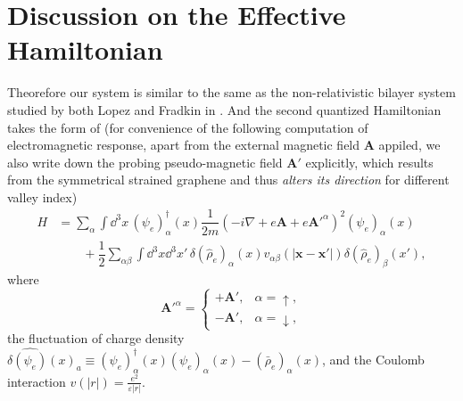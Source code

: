 \documentclass[bachelor,english,numbers]{ustcthesis}
\begin{document}
	\section{Discussion on the Effective Hamiltonian}
		\indent\par 
		\iffalse
			To sum up, in our case the free part of the massless Dirac fermion in graphene is now dominated by the second quantized Hamiltonian
			\begin{equation}\label{1.1.2}
				H_0=\sum_{\alpha}\sum_{\bm{p}}(\psi_e)_\alpha^\dagger (-1)^\alpha v_F\bm{\sigma}\cdot(\bm{p}+(-1)^\alpha e\bm{A})(\psi_e)_\alpha,
			\end{equation}
			where $a=1,2,3,4$ represent the sublattice and valley degenerancy such that the eigenstate is chosen in the order $(\psi_e)_\alpha\equiv\left((\psi_e)_{K\uparrow}, (\psi_e)_{K'\uparrow}, (\psi_e)_{K\downarrow}, (\psi_e)_{K'\downarrow}\right)$. The subscripts $e$ is still introduced to distinguish the field operators of massless Dirac fermions with those of composite Dirac fermions. But the RG flow analysis conducted by Sheely {\it et al.} in \cite{sheehy2007quantum} revealed that, Coulomb interaction also plays a significant role near the quantum cirtical point in graphene. Therefore the whole Hamiltonian takes the form of
			\begin{equation}\label{1.1.3}
				H=\sum_{\alpha}\sum_{\bm{p}}(\psi_e)_\alpha^\dagger(-1)^\alpha v_F\bm{\sigma}\cdot(\bm{p}+(-1)^\alpha e\bm{A})(\psi_e)_\alpha+\dfrac{1}{2}\sum_{\alpha,\alpha'}(\psi_e)_\alpha^\dagger(\psi_e)_{\alpha'}^\dagger v(q) (\psi_e)_{\alpha'}(\psi_e)_{\alpha}.
			\end{equation}
		\fi
		Theorefore our system is similar to the same as the non-relativistic bilayer system studied by both Lopez and Fradkin in \cite{lopez1995fermionic,rajaraman1997generalized}. And the second quantized Hamiltonian takes the form of (for convenience of the following computation of electromagnetic response, apart from the external magnetic field $\bm{A}$ appiled, we also write down the probing pseudo-magnetic field $\bm{A'}$ explicitly, which results from the symmetrical strained graphene and thus \emph{alters its direction} for different valley index)
		\begin{align}\label{2.1.1}
			H&=\sum_\alpha\int\dd^3x\,(\psi_e)^\dagger_\alpha(x)\dfrac{1}{2m}\left(-i\nabla+e\bm{A}+e\bm{A'}^\alpha\right)^2(\psi_e)_\alpha(x)\nonumber\\
			&\qquad+\dfrac{1}{2}\sum_{\alpha \beta}\int\dd^3x\dd^3x'\,\delta(\hat{\rho}_e)_\alpha(x)v_{\alpha \beta}(|\bm{x}-\bm{x'}|)\delta(\hat{\rho}_e)_\beta(x'),
		\end{align}
		where 
		\begin{equation*}
			\bm{A'}^\alpha=\begin{cases}
				+\bm{A'},&\alpha=\uparrow,\\
				-\bm{A'},&\alpha=\downarrow,
			\end{cases}
		\end{equation*}
		the fluctuation of charge density $\delta\hat{(\psi_e)}(x)_a\equiv(\psi_e)^\dagger_\alpha(x)(\psi_e)_\alpha(x)-(\bar{\rho}_e)_\alpha(x)$, and the Coulomb interaction $v(|r|)=\frac{e^2}{\varepsilon |r|}$.
\end{document}
